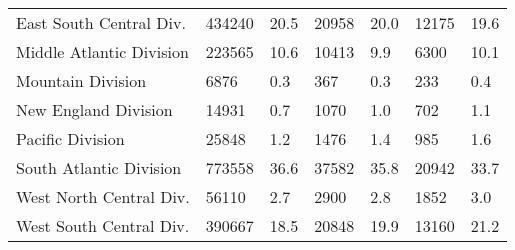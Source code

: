 \begin{longtable}{lllllll}
East South Central Div. & 434240 & 20.5 & 20958 & 20.0 & 12175 & 19.6 \\ 
Middle Atlantic Division & 223565 & 10.6 & 10413 & 9.9 & 6300 & 10.1 \\ 
Mountain Division & 6876 & 0.3 & 367 & 0.3 & 233 & 0.4 \\ 
New England Division & 14931 & 0.7 & 1070 & 1.0 & 702 & 1.1 \\ 
Pacific Division & 25848 & 1.2 & 1476 & 1.4 & 985 & 1.6 \\ 
South Atlantic Division & 773558 & 36.6 & 37582 & 35.8 & 20942 & 33.7 \\ 
West North Central Div. & 56110 & 2.7 & 2900 & 2.8 & 1852 & 3.0 \\ 
West South Central Div. & 390667 & 18.5 & 20848 & 19.9 & 13160 & 21.2 \\ 
 \bottomrule
\end{longtable}

